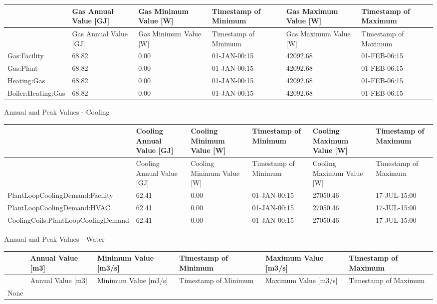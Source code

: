 {\scriptsize
\begin{longtable}[c]{>{\raggedright}p{1.0in}>{\raggedright}p{1.0in}>{\raggedright}p{1.0in}>{\raggedright}p{1.0in}>{\raggedright}p{1.0in}>{\raggedright}p{1.0in}}
\toprule 
 & Gas Annual Value [GJ] & Gas Minimum Value [W] & Timestamp of Minimum & Gas Maximum Value [W] & Timestamp of Maximum \tabularnewline
\midrule
\endfirsthead

\toprule 
 & Gas Annual Value [GJ] & Gas Minimum Value [W] & Timestamp of Minimum & Gas Maximum Value [W] & Timestamp of Maximum \tabularnewline
\midrule
\endhead

Gas\-:Facility & 68.82 & 0.00 & 01-JAN-00\-:15 & 42092.68 & 01-FEB-06\-:15 \tabularnewline
Gas\-:Plant & 68.82 & 0.00 & 01-JAN-00\-:15 & 42092.68 & 01-FEB-06\-:15 \tabularnewline
Heating\-:Gas & 68.82 & 0.00 & 01-JAN-00\-:15 & 42092.68 & 01-FEB-06\-:15 \tabularnewline
Boiler\-:Heating\-:Gas & 68.82 & 0.00 & 01-JAN-00\-:15 & 42092.68 & 01-FEB-06\-:15 \tabularnewline
\bottomrule
\end{longtable}}

Annual and Peak Values - Cooling

{\scriptsize
\begin{longtable}[c]{>{\raggedright}p{1.0in}>{\raggedright}p{1.0in}>{\raggedright}p{1.0in}>{\raggedright}p{1.0in}>{\raggedright}p{1.0in}>{\raggedright}p{1.0in}}
\toprule 
 & Cooling Annual Value [GJ] & Cooling Minimum Value [W] & Timestamp of Minimum & Cooling Maximum Value [W] & Timestamp of Maximum \tabularnewline
\midrule
\endfirsthead

\toprule 
 & Cooling Annual Value [GJ] & Cooling Minimum Value [W] & Timestamp of Minimum & Cooling Maximum Value [W] & Timestamp of Maximum \tabularnewline
\midrule
\endhead

PlantLoopCoolingDemand\-:Facility & 62.41 & 0.00 & 01-JAN-00\-:15 & 27050.46 & 17-JUL-15\-:00 \tabularnewline
PlantLoopCoolingDemand\-:HVAC & 62.41 & 0.00 & 01-JAN-00\-:15 & 27050.46 & 17-JUL-15\-:00 \tabularnewline
CoolingCoils\-:PlantLoopCoolingDemand & 62.41 & 0.00 & 01-JAN-00\-:15 & 27050.46 & 17-JUL-15\-:00 \tabularnewline
\bottomrule
\end{longtable}}

Annual and Peak Values - Water

\begin{longtable}[c]{>{\raggedright}p{1.0in}>{\raggedright}p{1.0in}>{\raggedright}p{1.0in}>{\raggedright}p{1.0in}>{\raggedright}p{1.0in}>{\raggedright}p{1.0in}}
\toprule 
 & Annual Value [m3] & Minimum Value [m3/s] & Timestamp of Minimum & Maximum Value [m3/s] & Timestamp of Maximum \tabularnewline
\midrule
\endfirsthead

\toprule 
 & Annual Value [m3] & Minimum Value [m3/s] & Timestamp of Minimum & Maximum Value [m3/s] & Timestamp of Maximum \tabularnewline
\midrule
\endhead

None & ~ & ~ & ~ & ~ & ~ \tabularnewline
\bottomrule
\end{longtable}

